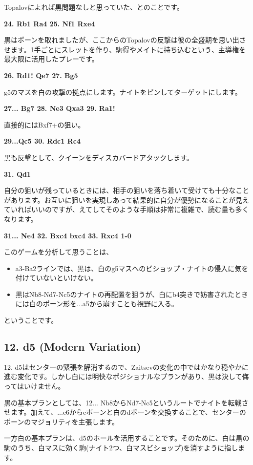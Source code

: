 Topalovによれば黒問題なしと思っていた、とのことです。

{\bf 24. Rb1 Ra4 25. Nf1 Rxe4}

黒はポーンを取れましたが、ここからのTopalovの反撃は彼の全盛期を思い出させます。1手ごとにスレットを作り、駒得やメイトに持ち込むという、主導権を最大限に活用したプレーです。

{\bf 26. Rd1! Qe7 27. Bg5}

g5のマスを白の攻撃の拠点にします。ナイトをピンしてターゲットにします。

{\bf 27... Bg7 28. Ne3 Qxa3 29. Ra1!}

直接的にはBxf7+の狙い。

{\bf 29...Qc5 30. Rdc1 Rc4}

黒も反撃として、クイーンをディスカバードアタックします。

{\bf 31. Qd1}

自分の狙いが残っているときには、相手の狙いを落ち着いて受けても十分なことがあります。お互いに狙いを実現しあって結果的に自分が優勢になることが見えていればいいのですが、えてしてそのような手順は非常に複雑で、読む量も多くなります。

{\bf 31... Ne4 32. Bxc4 bxc4 33. Rxc4 1-0}

このゲームを分析して思うことは、
\begin{itemize}
    \item a3-Ba2ラインでは、黒は、白のg5マスへのビショップ・ナイトの侵入に気を付けていないといけない。
    \item 黒はNb8-Nd7-Nc5のナイトの再配置を狙うが、白にb4突きで妨害されたときには白のポーン形を...a5から崩すことも視野に入る。
\end{itemize}
ということです。

\subsection{12. d5 (Modern Variation)}
12. d5はセンターの緊張を解消するので、Zaitsevの変化の中ではかなり穏やかに進む変化です。しかし白には明快なポジショナルなプランがあり、黒は決して侮ってはいけません。

黒の基本プランとしては、12... Nb8からNd7-Nc5というルートでナイトを転戦させます。加えて、...c6からcポーンと白のdポーンを交換することで、センターのポーンのマジョリティを主張します。

一方白の基本プランは、d5のホールを活用することです。そのために、白は黒の駒のうち、白マスに効く駒(ナイト2つ、白マスビショップ)を消すように指します。

